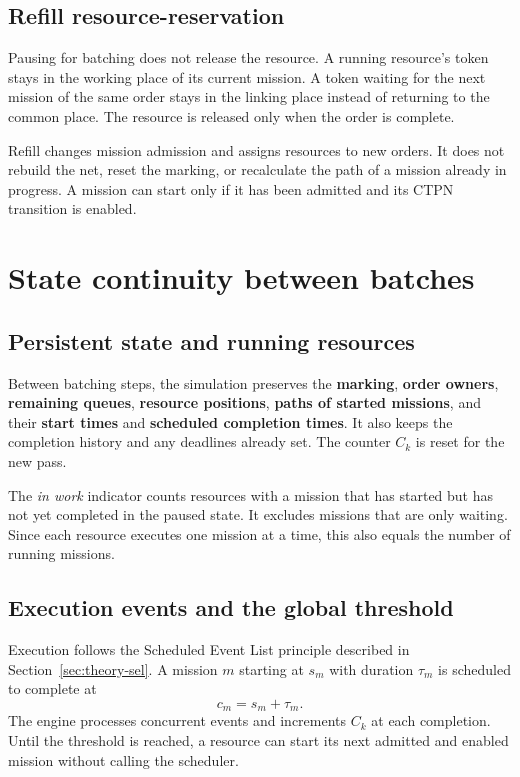 \subsection{Refill resource-reservation}

Pausing for batching does not release the resource. A running resource's token
stays in the working place of its current mission. A token waiting for the next
mission of the same order stays in the linking place instead of returning to
the common place. The resource is released only when the order is complete.

Refill changes mission admission and assigns resources to new orders. It does
not rebuild the net, reset the marking, or recalculate the path of a mission
already in progress. A mission can start only if it has been admitted and its
CTPN transition is enabled.

\section{State continuity between batches}
\label{sec:progetto-tempo}

\subsection{Persistent state and running resources}

Between batching steps, the simulation preserves the \textbf{marking},
\textbf{order owners}, \textbf{remaining queues}, \textbf{resource positions},
\textbf{paths of started missions}, and their \textbf{start times} and
\textbf{scheduled completion times}. It also keeps the completion history and
any deadlines already set. The counter $C_k$ is reset for the new pass.

The \textit{in work} indicator counts resources with a mission that has started
but has not yet completed in the paused state. It excludes missions that are
only waiting. Since each resource executes one mission at a time, this also
equals the number of running missions.

\subsection{Execution events and the global threshold}

Execution follows the Scheduled Event List principle described in
Section~\ref{sec:theory-sel}. A mission $m$ starting at $s_m$ with duration
$\tau_m$ is scheduled to complete at
\begin{equation}
    c_m=s_m+\tau_m.
\end{equation}
The engine processes concurrent events and increments $C_k$ at each completion.
Until the threshold is reached, a resource can start its next admitted and
enabled mission without calling the scheduler.

